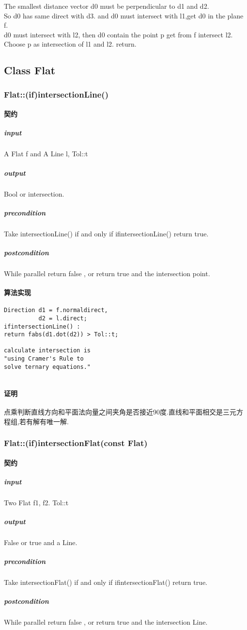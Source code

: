 \documentclass[a4paper]{book}
\numberwithin{equation}{chapter}
\theoremstyle{definition}
\begin{document}
\begin{multicols}{2}
The smallest distance vector d0 must be perpendicular to d1 and d2. \\

So d0 has same direct with d3.
and d0 must intersect with l1,get d0 in the plane f. \\

d0 must intersect with l2, then d0 contain the point p get from f intersect l2. \\

Choose p as intersection of l1 and l2. return.


\subsection{Class Flat}

\subsubsection{Flat::(if)intersectionLine()}
\paragraph{契约}
\subparagraph{input}
A Flat f and A Line l, Tol::t
\subparagraph{output}
Bool or intersection.
\subparagraph{precondition}
Take intersectionLine() if and only if ifintersectionLine() return true.
\subparagraph{postcondition}
While parallel return false , or return true and the intersection point.
\paragraph{算法实现}
\begin{lstlisting}
Direction d1 = f.normaldirect,
          d2 = l.direct;
ifintersectionLine() : 
return fabs(d1.dot(d2)) > Tol::t;

calculate intersection is 
"using Cramer's Rule to 
solve ternary equations."


\end{lstlisting}
\paragraph{证明}
点乘判断直线方向和平面法向量之间夹角是否接近90度.直线和平面相交是三元方程组,若有解有唯一解.


\subsubsection{Flat::(if)intersectionFlat(const Flat)}
\paragraph{契约}
\subparagraph{input}
Two Flat f1, f2. Tol::t
\subparagraph{output}
False or true and a Line. 
\subparagraph{precondition}
Take intersectionFlat() if and only if ifintersectionFlat() return true.
\subparagraph{postcondition}
While parallel return false , or return true and the intersection Line.

\end{multicols}
\end{document}
